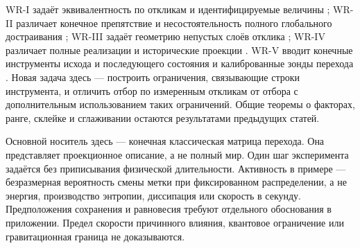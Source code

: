 {WR-I задаёт эквивалентность по откликам и идентифицируемые величины \cite{WRI}; WR-II различает конечное препятствие и несостоятельность полного глобального достраивания \cite{WRII}; WR-III задаёт геометрию непустых слоёв отклика \cite{WRIII}; WR-IV различает полные реализации и исторические проекции \cite{WRIV}. WR-V вводит конечные инструменты исхода и последующего состояния и калиброванные зонды перехода \cite{WRV}. Новая задача здесь --- построить ограничения, связывающие строки инструмента, и отличить отбор по измеренным откликам от отбора с дополнительным использованием таких ограничений. Общие теоремы о факторах, ранге, склейке и сглаживании остаются результатами предыдущих статей.}

{Основной носитель здесь --- конечная классическая матрица перехода. Она представляет проекционное описание, а не полный мир. Один шаг эксперимента задаётся без приписывания физической длительности. Активность в примере --- безразмерная вероятность смены метки при фиксированном распределении, а не энергия, производство энтропии, диссипация или скорость в секунду. Предположения сохранения и равновесия требуют отдельного обоснования в приложении. Предел скорости причинного влияния, квантовое ограничение или гравитационная граница не доказываются.}

